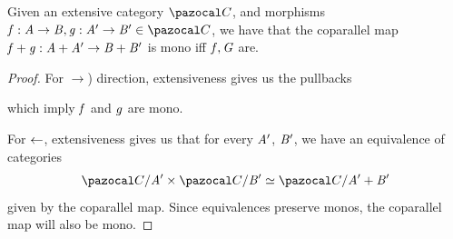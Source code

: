 \begin{lemma}\label{lem:monos-coparallel-extensive}
    Given an extensive category $\mcatC$, and morphisms $\vf : \vA \to \vB, \vg : \vA' \to \vB' \in \mcatC$, 
    we have that the coparallel map $\mathit{f} + \mathit{g} : \mathit{A} + \mathit{A}' \to \mathit{B} + \mathit{B}'$ is mono iff $\mathit{f},\mathit{G}$ are.
\end{lemma}
\begin{proof}
    For $\to$) direction, extensiveness gives us the pullbacks
    \begin{center}
    \end{center}
    which imply $\mathit{f}$ and $\mathit{g}$ are mono.

    For $\leftarrow$, extensiveness gives us that for every $\mathit{A}'$, $\mathit{B}'$, we have an equivalence of categories
    \[ \sliceC\mcatC{\vA'} \times \sliceC\mcatC{\vB'} \equivC \sliceC\mcatC{\vA' + \vB'} \]
    given by the coparallel map.
    Since equivalences preserve monos, the coparallel map will also be mono.
\end{proof}
